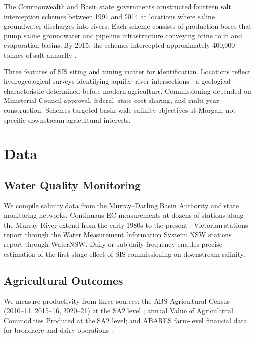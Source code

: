 \documentclass[12pt]{article}
\begin{document}
The Commonwealth and Basin state governments constructed fourteen salt interception schemes between 1991 and 2014 at locations where saline groundwater discharges into rivers. Each scheme consists of production bores that pump saline groundwater and pipeline infrastructure conveying brine to inland evaporation basins. By 2015, the schemes intercepted approximately 400,000 tonnes of salt annually \citep{hart2020salinity}.

Three features of SIS siting and timing matter for identification. Locations reflect hydrogeological surveys identifying aquifer--river intersections---a geological characteristic determined before modern agriculture. Commissioning depended on Ministerial Council approval, federal--state cost-sharing, and multi-year construction. Schemes targeted basin-wide salinity objectives at Morgan, not specific downstream agricultural interests.


\section{Data}\label{sec:data}

\subsection{Water Quality Monitoring}

We compile salinity data from the Murray--Darling Basin Authority and state monitoring networks. Continuous EC measurements at dozens of stations along the Murray River extend from the early 1980s to the present \citep{biswas2019mountain}. Victorian stations report through the Water Measurement Information System; NSW stations report through WaterNSW. Daily or sub-daily frequency enables precise estimation of the first-stage effect of SIS commissioning on downstream salinity.

\subsection{Agricultural Outcomes}

We measure productivity from three sources: the ABS Agricultural Census (2010--11, 2015--16, 2020--21) at the SA2 level \citep{abs2022agcensus}; annual Value of Agricultural Commodities Produced at the SA2 level; and ABARES farm-level financial data for broadacre and dairy operations \citep{abares2023farmsurvey}.
\end{document}
